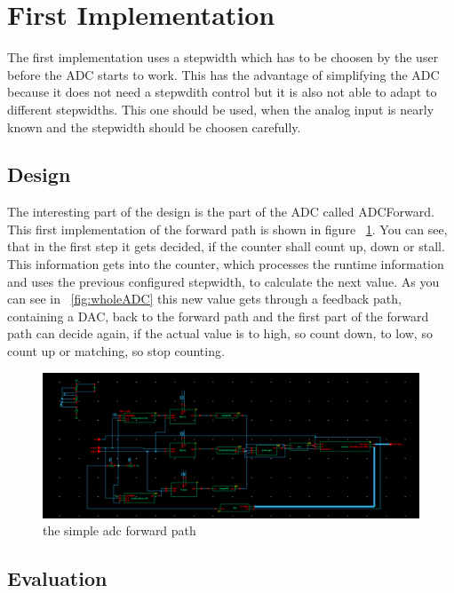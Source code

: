 \section{First Implementation}

The first implementation uses a stepwidth which has to be choosen by the user before the ADC starts to work. This has the advantage of simplifying the ADC because it does not need a stepwdith control but it is also not able to adapt to different stepwidths. This one should be used, when the analog input is nearly known and the stepwidth should be choosen carefully.

\subsection{Design}

The interesting part of the design is the part of the ADC called ADCForward. This first implementation of the forward path is shown in figure ~\ref{fig:simpleForward}. You can see, that in the first step it gets decided, if the counter shall count up, down or stall. This information gets into the counter, which processes the runtime information and uses the previous configured stepwidth, to calculate the next value. As you can see in ~\ref{fig:wholeADC} this new value gets through a feedback path, containing a DAC, back to the forward path and the first part of the forward path can decide again, if the actual value is to high, so count down, to low, so count up or matching, so stop counting.

\begin{figure}[h]
	\centering
	\includegraphics[scale=0.45]{images/adc/adcForward.png}
	\caption{the simple adc forward path}
	\label{fig:simpleForward}
\end{figure}

\subsection{Evaluation}

